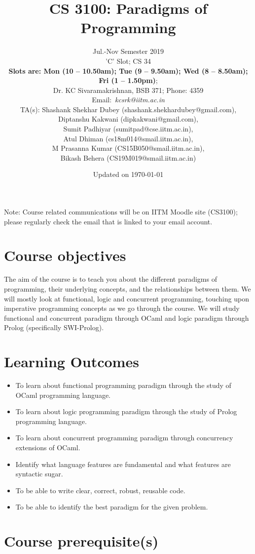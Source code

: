 \documentclass[10pt]{article}
\title{CS 3100: Paradigms of Programming}
\author{Jul.-Nov Semester 2019 \\
'C'  Slot; CS 34 \\
\textbf{Slots are: Mon (10 -- 10.50am); Tue (9 -- 9.50am); Wed (8 -- 8.50am); Fri (1 -- 1.50pm)}; \\
Dr. KC Sivaramakrishnan, BSB 371; Phone: 4359 \\
Email:~\textit{kcsrk@iitm.ac.in} \\
TA(s):
  Shashank Shekhar Dubey (shashank.shekhardubey@gmail.com), \\
	Diptanshu Kakwani (dipkakwani@gmail.com), \\
	Sumit Padhiyar (sumitpad@cse.iitm.ac.in), \\
	Atul Dhiman (cs18m014@smail.iitm.ac.in), \\
	M Prasanna Kumar (CS15B050@smail.iitm.ac.in), \\
	Bikash Behera (CS19M019@smail.iitm.ac.in)
}
\date{Updated on \today}
\begin{document}
\maketitle

Note: Course related communications will be on IITM Moodle site (CS3100);
please regularly check the email that is linked to your email account.

\section{Course objectives}

The aim of the course is to teach you about the different paradigms of
programming, their underlying concepts, and the relationships between them. We
will mostly look at functional, logic and concurrent programming, touching upon
imperative programming concepts as we go through the course. We will study
functional and concurrent paradigm through OCaml and logic paradigm through
Prolog (specifically SWI-Prolog).

\section{Learning Outcomes}

\begin{itemize}

\item To learn about functional programming paradigm through the study of OCaml
	programming language.

\item To learn about logic programming paradigm through the study of Prolog
	programming language.

\item To learn about concurrent programming paradigm through concurrency
	extensions of OCaml.

\item Identify what language features are fundamental and what features are
	syntactic sugar.

\item To be able to write clear, correct, robust, reusable code.

\item To be able to identify the best paradigm for the given problem.

\end{itemize}

\section{Course prerequisite(s)}
\end{document}
